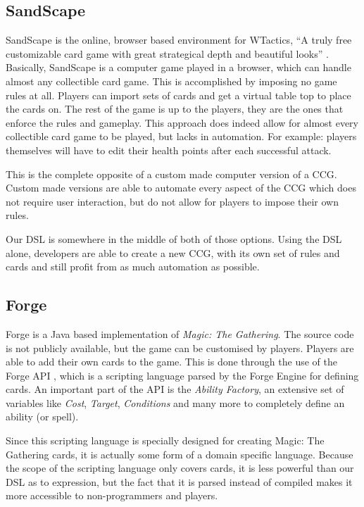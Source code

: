 %
\subsection{SandScape}
SandScape \cite{sandscape} is the online, browser based environment for WTactics, ``A truly free customizable card game with great strategical depth and beautiful looks'' \cite{wtactics}. Basically, SandScape is a computer game played in a browser, which can handle almost any collectible card game. This is accomplished by imposing no game rules at all. Players can import sets of cards and get a virtual table top to place the cards on. The rest of the game is up to the players, they are the ones that enforce the rules and gameplay. This approach does indeed allow for almost every collectible card game to be played, but lacks in automation. For example: players themselves will have to edit their health points after each successful attack.

This is the complete opposite of a custom made computer version of a CCG. Custom made versions are able to automate every aspect of the CCG which does not require user interaction, but do not allow for players to impose their own rules.

Our DSL is somewhere in the middle of both of those options. Using the DSL alone, developers are able to create a new CCG, with its own set of rules and cards and still profit from as much automation as possible.

\subsection{Forge}
Forge \cite{forge} is a Java based implementation of \textit{Magic: The Gathering}. The source code is not publicly available, but the game can be customised by players. Players are able to add their own cards to the game. This is done through the use of the Forge API \cite{forge-api}, which is a scripting language parsed by the Forge Engine for defining cards. An important part of the API is the \textit{Ability Factory}, an extensive set of variables like \textit{Cost}, \textit{Target}, \textit{Conditions} and many more to completely define an ability (or spell).

Since this scripting language is specially designed for creating Magic: The Gathering cards, it is actually some form of a domain specific language. Because the scope of the scripting language only covers cards, it is less powerful than our DSL as to expression, but the fact that it is parsed instead of compiled makes it more accessible to non-programmers and players.